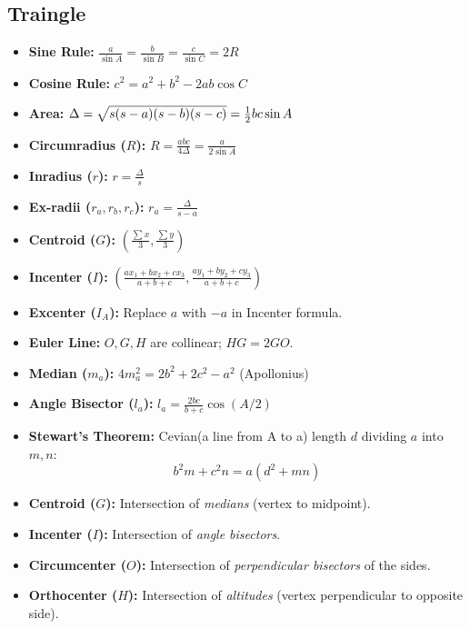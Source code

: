 \subsection{Traingle}
\begin{itemize}[leftmargin=*]
    \item \textbf{Sine Rule:} $\frac{a}{\sin A} = \frac{b}{\sin B} = \frac{c}{\sin C} = 2R $
    \item \textbf{Cosine Rule:} $c^2 = a^2 + b^2 - 2ab \cos C$
    \item \textbf{Area:} $\Delta = \sqrt{s(s-a)(s-b)(s-c)} \\ = \frac{1}{2}bc \sin A$
    \item \textbf{Circumradius ($R$):} $R = \frac{abc}{4\Delta} = \frac{a}{2\sin A}$
    \item \textbf{Inradius ($r$):} $r = \frac{\Delta}{s}$
    \item \textbf{Ex-radii ($r_a, r_b, r_c$):} $r_a = \frac{\Delta}{s-a}$
    \item \textbf{Centroid ($G$):} $\left( \frac{\sum x}{3}, \frac{\sum y}{3} \right)$
    \item \textbf{Incenter ($I$):} $\left( \frac{ax_1+bx_2+cx_3}{a+b+c}, \frac{ay_1+by_2+cy_3}{a+b+c} \right)$
    \item \textbf{Excenter ($I_A$):} Replace $a$ with $-a$ in Incenter formula.
    \item \textbf{Euler Line:} $O, G, H$ are collinear; $HG = 2GO$.
    \item \textbf{Median ($m_a$):} $4m_a^2 = 2b^2 + 2c^2 - a^2$ (Apollonius)
    \item \textbf{Angle Bisector ($l_a$):} $l_a = \frac{2bc}{b+c}\cos(A/2)$
    \item \textbf{Stewart's Theorem:} Cevian(a line from A to a) length $d$ dividing $a$ into $m, n$:
    \[ b^2m + c^2n = a(d^2 + mn) \]
    \item \textbf{Centroid ($G$):} Intersection of \textit{medians} (vertex to midpoint).
    \item \textbf{Incenter ($I$):} Intersection of \textit{angle bisectors}.
    \item \textbf{Circumcenter ($O$):} Intersection of \textit{perpendicular bisectors} of the sides.
    \item \textbf{Orthocenter ($H$):} Intersection of \textit{altitudes} (vertex perpendicular to opposite side).
\end{itemize}
